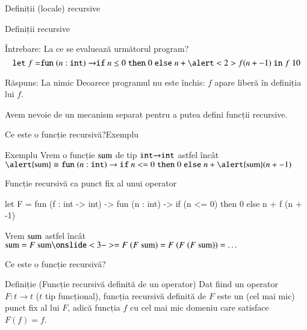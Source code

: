\documentclass[xcolor=pdftex,romanian,colorlinks]{beamer}
\begin{document}
\begin{section}{Definiții (locale) recursive}

\begin{frame}{Definiții recursive }
\begin{block}{Întrebare: La ce se evaluează următorul program?}
\small
\[\Slet f = \Sfun (n:{\Sint})\rightarrow \Sif n \leq 0 \Sthen 0 \Selse n + \alert<2>{f} (n + -1) \Sin f\; 10\] 
\end{block}

\begin{alertblock}{Răspuns: La nimic}
Deoarece programul nu este închis: $f$ apare liberă în definiția lui $f$. 

Avem nevoie de un mecanism separat  pentru a putea defini funcții recursive.
\end{alertblock}

\end{frame}


\begin{frame}[fragile]{Ce este o funcție recursivă?}{Exemplu}
\begin{block}{Exemplu}
  Vrem o funcție ${\rm sum}$ de tip $\mathrel{\text{\ttfamily int}} \rightarrow \mathrel{\text{\ttfamily int}}$ astfel încât
 $\alert{\rm sum} \equiv  
  {\Sfun (n : {\Sint}) \rightarrow
    {\Sif n <= 0 \Sthen 0 \Selse n + \alert{\rm sum} (n + -1)}}$
\end{block}

\begin{block}{Funcție recursivă ca punct fix al unui operator}
\begin{asciiml}
let F =  fun (f : int -> int) -> 
  fun (n : int) -> if (n <= 0) then 0 else n + f (n + -1)
\end{asciiml}

Vrem ${\rm sum}$ astfel încât ${\rm sum} = F\; {\rm sum}\onslide<3-> = F\; (F\; {\rm sum}) = F\; (F\; (F\; {\rm sum})) = \ldots$
\end{block}

\end{frame}

\begin{frame}{Ce este o funcție recursivă?}
\begin{block}{Definiție (Funcție recursivă definită de un operator)}
Dat fiind un operator $F : t \rightarrow t$ ($t$ tip funcțional), funcția recursivă definită de $F$ este un (cel mai mic) punct fix al lui $F$, adică funcția $f$ cu cel mai mic domeniu care satisface $F(f) = f$.
\end{block} 


\end{frame}
\end{section}
\end{document}
